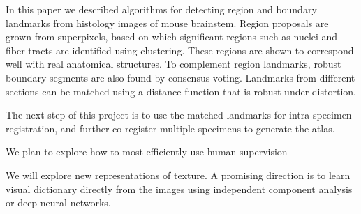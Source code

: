 \documentclass{llncs}
\begin{document}
In this paper we described algorithms for detecting region and boundary landmarks from histology images of mouse brainstem. Region proposals are grown from superpixels, based on which significant regions such as nuclei and fiber tracts are identified using clustering. These regions are shown to correspond well with real anatomical structures. To complement region landmarks, robust boundary segments are also found by consensus voting. Landmarks from different sections can be matched using a distance function that is robust under distortion.

The next step of this project is to use the matched landmarks for intra-specimen registration, and further co-register multiple specimens to generate the atlas.

We plan to explore how to most efficiently use human supervision

We will explore new representations of texture. A promising direction is to learn visual dictionary directly from the images using independent component analysis or deep neural networks.





%
%




%
%
\end{document}
